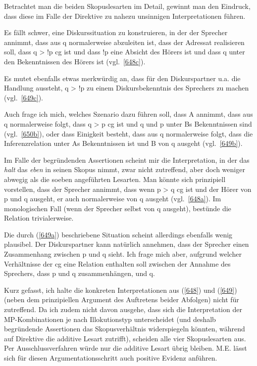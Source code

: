 Betrachtet man die beiden Skopuslesarten im Detail, gewinnt man den Eindruck, dass diese im Falle der Direktive zu nahezu unsinnigen Interpretationen führen. 
	                    
Es fällt schwer, eine Diskurssituation zu konstruieren, in der der Sprecher annimmt, dass aus q normalerweise abzuleiten ist, dass der Adressat realisieren soll, dass q > !p cg ist und dass !p eine Absicht des Hörers ist und dass q unter den Bekenntnissen des Hörers ist (vgl.\ \ref{648c}).

Es mutet ebenfalls etwas merkwürdig an, dass für den Diskurspartner u.a. die Handlung aussteht, q > !p zu einem Diskursbekenntnis des Sprechers zu machen (vgl.\ \ref{649c}).

Auch frage ich mich, welches Szenario dazu führen soll, dass A annimmt, dass aus q normalerweise folgt, dass q > p cg ist und q und p unter Bs Bekenntnissen sind (vgl.\ \ref{650b}), oder dass Einigkeit besteht, dass aus q normalerweise folgt, dass die Inferenzrelation unter As Bekenntnissen ist und B von q ausgeht (vgl.\ \ref{649b}).

Im Falle der begründenden Assertionen scheint mir die Interpretation, in der das \textit{halt} das \textit{eben} in seinen Skopus nimmt, zwar nicht zutreffend, aber doch weniger abwegig als die soeben angeführten Lesarten. Man könnte sich prinzi\-piell vorstellen, dass der Sprecher annimmt, dass wenn p > q cg ist und der Hörer von p und q ausgeht, er auch normalerweise von q ausgeht (vgl.\ \ref{648a}). Im monologischen Fall (wenn der Sprecher selbst von q ausgeht), bestünde die Relation trivialerweise.

Die durch (\ref{649a}) beschriebene Situation scheint allerdings ebenfalls wenig plausibel. Der Diskurspartner kann natürlich annehmen, dass der Sprecher einen Zusammenhang zwischen p und q sieht. Ich frage mich aber, aufgrund welcher Verhältnisse der cg eine Relation enthalten soll zwischen der Annahme des Sprechers, dass p und q zusammenhängen, und q.

Kurz gefasst, ich halte die konkreten Interpretationen aus (\ref{648}) und (\ref{649}) (neben dem prinzipiellen Argument des Auftretens beider Abfolgen) nicht für zutreffend. Da ich zudem nicht davon ausgehe, dass sich die Interpretation der MP-Kom\-bi\-na\-ti\-on\-en je nach Illokutionstyp unterscheidet (und deshalb begründende Assertionen das Skopusverhältnis widerspiegeln könnten, während auf Direktive die additive Lesart zutrifft), scheiden alle vier Skopuslesarten aus. Per Aus\-schlussverfahren würde nur die additive Lesart übrig bleiben. M.E. lässt sich für diesen Argumentationsschritt auch  positive Evidenz anführen.


